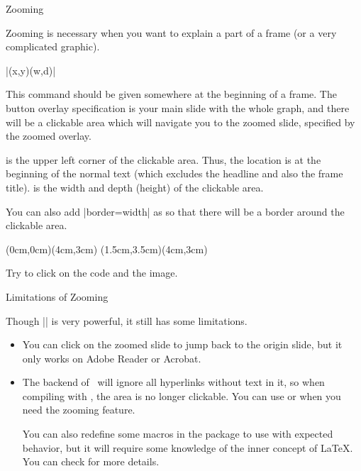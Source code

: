 \begin{fragileframe}{Zooming}

Zooming is necessary when you want to explain a part of a frame (or a very complicated graphic).

\begin{command}
\LC|(x,y)(w,d)|
\end{command}

This command should be given somewhere at the beginning of a frame. The button overlay specification is your main slide with the whole graph, and there will be a clickable area which will navigate you to the zoomed slide, specified by the zoomed overlay. \medskip

 is the upper left corner of the clickable area. Thus,
the location \packagename{(0pt,0pt)} is at the beginning of the normal text (which excludes the headline and also the frame title).  is the width and depth (height) of the clickable area. \medskip

You can also add \LC|border=width| as  so that there will be a border around the clickable area.

\end{fragileframe}

\begin{fragileframe}

\begin{latexexample}
(0cm,0cm)(4cm,3cm)
(1.5cm,3.5cm)(4cm,3cm)
\end{latexexample}

Try to click on the code and the image.

\end{fragileframe}

\begin{fragileframe}{Limitations of Zooming}

Though \LC|\framezoom| is very powerful, it still has some limitations.

\begin{itemize}
\item You can click on the zoomed slide to jump back to the origin slide, but it only works on Adobe Reader or Acrobat.
\item The backend of \XeLaTeX\ will ignore all hyperlinks without text in it, so when compiling with , the area is no longer clickable. You can use  or  when you need the zooming feature. \medskip

You can also redefine some macros in the  package to use  with expected behavior, but it will require some knowledge of the inner concept of \LaTeX. You can check \href{https://github.com/SJTU-UMJI-Tech/LaTeX/blob/master/lecture/lecture.sty}{} for more details.
\end{itemize}

\end{fragileframe}

